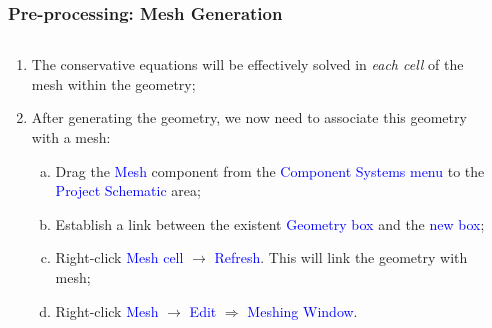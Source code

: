\documentclass[10pt,compress, unknownkeysallowed]{beamer}
\newcommand{\blue}{\textcolor{blue}}
\begin{document}
\begin{frame}
 \frametitle{Pre-processing: Mesh Generation} 
    \begin{columns}
       \begin{column}[l]{0.5\linewidth}
          \begin{enumerate}\scriptsize
             \item<1-> The conservative equations will be effectively solved in {\it each cell} of the mesh within the geometry;
             \item<1-> After generating the geometry, we now need to associate this geometry with a mesh:
                \begin{enumerate}[a)]\scriptsize
                   \item<2-> Drag the \blue{Mesh} component from the \blue{Component Systems menu} to the \blue{Project Schematic} area;
                   \item<2-> Establish a link between the existent \blue{Geometry box} and the \blue{new box}; 
                   \item<2-> Right-click \blue{Mesh cell} $\rightarrow$ \blue{Refresh}. This will link the geometry with mesh; 
                   \item<2-> Right-click \blue{Mesh} $\rightarrow$ \blue{Edit} $\Longrightarrow$ \blue{Meshing Window}.
                \end{enumerate}
          \end{enumerate}
       \end{column}
       \begin{column}[l]{0.5\linewidth}
       \end{column}
    \end{columns}
\end{frame} 
\end{document}
